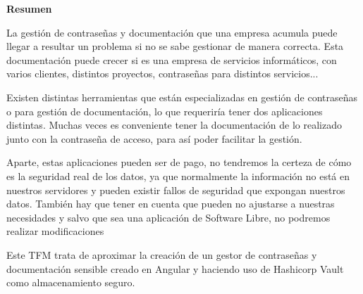 \documentclass{\ClassPath/viu-tfm-template}
\begin{document}
\graphicspath{{../VIU_TFM_LaTeX_template/}}

\coverpage




\vspace*{\fill}
\begin{center}
    \textbf{Resumen}
\end{center}

La gestión de contraseñas y documentación que una empresa acumula puede llegar a resultar un problema si no se sabe gestionar de manera correcta. Esta documentación puede crecer si es una empresa de servicios informáticos, con varios clientes, distintos proyectos, contraseñas para distintos servicios...

Existen distintas herramientas que están especializadas en gestión de contraseñas o para gestión de documentación, lo que requeriría tener dos aplicaciones distintas. Muchas veces es conveniente tener la documentación de lo realizado junto con la contraseña de acceso, para así poder facilitar la gestión.

Aparte, estas aplicaciones pueden ser de pago, no tendremos la certeza de cómo es la seguridad real de los datos, ya que normalmente la información no está en nuestros servidores y pueden existir fallos de seguridad que expongan nuestros datos. También hay que tener en cuenta que pueden no ajustarse a nuestras necesidades y salvo que sea una aplicación de Software Libre, no podremos realizar modificaciones

Este TFM trata de aproximar la creación de un gestor de contraseñas y documentación sensible creado en Angular y haciendo uso de Hashicorp Vault como almacenamiento seguro.


\vspace*{\fill}
\vspace*{\fill}
\vspace*{\fill}

\pagebreak

\end{document}
